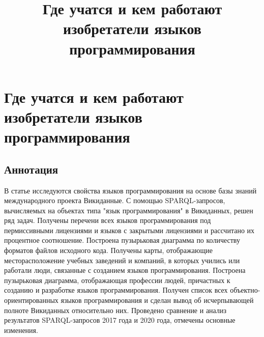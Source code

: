 \documentclass[12pt]{book}
\begin{document}
\title{Где учатся и кем работают изобретатели языков программирования}

\chapter{Где учатся и кем работают изобретатели языков программирования}
\label{ch:programming languages}
\section*{Аннотация}
В статье исследуются свойства языков программирования на основе базы знаний международного проекта Викиданные. С помощью SPARQL-запросов, вычисляемых на объектах типа "язык программирования" в Викиданных, решен ряд задач. Получены перечени всех языков программирования под пермиссивными лицензиями и языков с закрытыми лицензиями и рассчитано их процентное соотношение. Построена пузырьковая диаграмма по количеству форматов файлов исходного кода. Получены карты, отображающие месторасположение учебных заведений и компаний, в которых учились или работали люди, связанные с созданием языков программирования. Построена пузырьковая диаграмма, отображающая профессии людей, причастных к созданию и разработке языков программирования. Получен список всех объектно-ориентированных языков программирования и сделан вывод об исчерпывающей полноте Викиданных относительно них. Проведено сравнение и анализ результатов SPARQL-запросов 2017 года и 2020 года, отмечены основные изменения. 


\end{document}

